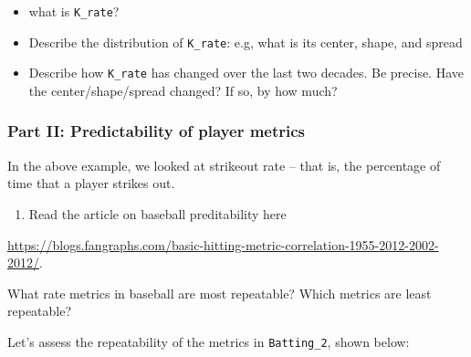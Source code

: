 \documentclass[]{article}
\providecommand{\tightlist}{%
  \setlength{\itemsep}{0pt}\setlength{\parskip}{0pt}}
\begin{document}
\begin{itemize}
\tightlist
\item
  what is \texttt{K\_rate}?
\item
  Describe the distribution of \texttt{K\_rate}: e.g, what is its
  center, shape, and spread
\item
  Describe how \texttt{K\_rate} has changed over the last two decades.
  Be precise. Have the center/shape/spread changed? If so, by how much?
\end{itemize}

\hypertarget{part-ii-predictability-of-player-metrics}{%
\subsubsection{Part II: Predictability of player
metrics}\label{part-ii-predictability-of-player-metrics}}

In the above example, we looked at strikeout rate -- that is, the
percentage of time that a player strikes out.

\begin{enumerate}
\def\labelenumi{\arabic{enumi}.}
\setcounter{enumi}{8}
\tightlist
\item
  Read the article on baseball preditability here
\end{enumerate}

\url{https://blogs.fangraphs.com/basic-hitting-metric-correlation-1955-2012-2002-2012/}.

What rate metrics in baseball are most repeatable? Which metrics are
least repeatable?

Let's assess the repeatability of the metrics in \texttt{Batting\_2},
shown below:
\end{document}
